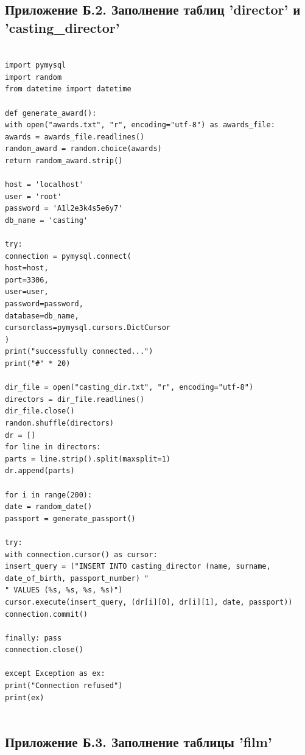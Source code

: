 \documentclass[11pt,a4paper,final]{article} %
\begin{document}
\subsection*{Приложение Б.2. Заполнение таблиц 'director' и 'casting\_director'}

\begin{lstlisting}

import pymysql
import random
from datetime import datetime

def generate_award():
with open("awards.txt", "r", encoding="utf-8") as awards_file:
awards = awards_file.readlines()
random_award = random.choice(awards)
return random_award.strip()

host = 'localhost'
user = 'root'
password = 'A1l2e3k4s5e6y7'
db_name = 'casting'

try:
connection = pymysql.connect(
host=host,
port=3306,
user=user,
password=password,
database=db_name,
cursorclass=pymysql.cursors.DictCursor
)
print("successfully connected...")
print("#" * 20)

dir_file = open("casting_dir.txt", "r", encoding="utf-8")
directors = dir_file.readlines()
dir_file.close()
random.shuffle(directors)
dr = []
for line in directors:
parts = line.strip().split(maxsplit=1)
dr.append(parts)

for i in range(200):
date = random_date()
passport = generate_passport()

try:
with connection.cursor() as cursor:
insert_query = ("INSERT INTO casting_director (name, surname, date_of_birth, passport_number) "
" VALUES (%s, %s, %s, %s)")
cursor.execute(insert_query, (dr[i][0], dr[i][1], date, passport))
connection.commit()

finally: pass
connection.close()

except Exception as ex:
print("Connection refused")
print(ex)	
	
\end{lstlisting}

	
	
\subsection*{Приложение Б.3. Заполнение таблицы 'film'}
\end{document}
